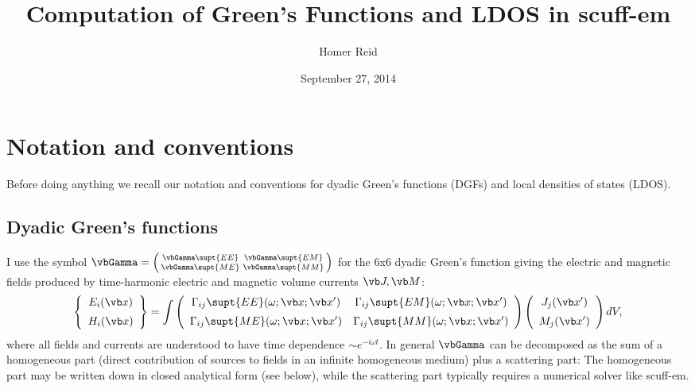\documentclass[letterpaper]{article}
\title {Computation of Green's Functions and LDOS in {\sc scuff-em}}
\author {Homer Reid}
\date {September 27, 2014}
\begin{document}
\pagestyle{myheadings}
\maketitle

\tableofcontents

\newpage
\section{Notation and conventions}

Before doing anything we recall our notation and conventions
for dyadic Green's functions (DGFs) and local densities of
states (LDOS).

\subsection*{Dyadic Green's functions}

I use the symbol
$\vbGamma=\left(\begin{smallmatrix}
\vbGamma\supt{EE} & \vbGamma\supt{EM} \\
\vbGamma\supt{ME} & \vbGamma\supt{MM}
\end{smallmatrix}\right)$ for the 6x6 dyadic Green's function
giving the electric and magnetic fields produced by
time-harmonic electric and magnetic volume currents
$\vb J, \vb M$:
$$
\left\{\begin{array}{c} E_i(\vb x) \\[5pt] H_i(\vb x) \end{array}\right\}
=
\int
\left(\begin{array}{cc}
 \Gamma_{ij}\supt{EE}(\omega; \vb x; \vb x^\prime) &
 \Gamma_{ij}\supt{EM}(\omega; \vb x; \vb x^\prime) \\[5pt]
 \Gamma_{ij}\supt{ME}(\omega; \vb x; \vb x^\prime) &
 \Gamma_{ij}\supt{MM}(\omega; \vb x; \vb x^\prime)
\end{array}\right)
\left(\begin{array}{c} J_j(\vb x^\prime) \\[5pt] M_j(\vb x^\prime) \end{array}\right)
dV,
$$
where all fields and currents are understood to have time dependence 
$\sim e^{-i\omega t}.$
In general $\vbGamma$ can be decomposed as the sum of a homogeneous
part (direct contribution of sources to fields in an infinite homogeneous
medium) plus a scattering part:
The homogeneous part may be written down in closed analytical form
(see below), while the scattering part typically requires a numerical
solver like {\sc scuff-em}.
\end{document}
